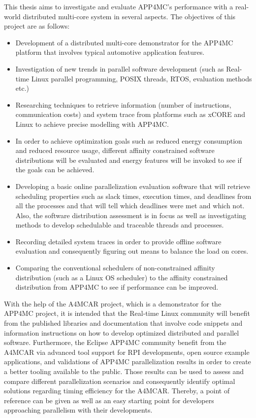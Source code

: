 This thesis aims to investigate and evaluate APP4MC's performance with a real-world distributed multi-core system in several aspects. The objectives of this project are as follows:
\begin{itemize}
	\item Development of a distributed multi-core demonstrator for the APP4MC platform that involves typical automotive application features.
	\item Investigation of new trends in parallel software development (such as Real-time Linux parallel programming, POSIX threads, RTOS, evaluation methods etc.)
	\item Researching techniques to retrieve information (number of instructions, communication costs) and system trace from platforms such as xCORE and Linux to achieve precise modelling with APP4MC.
	\item In order to achieve optimization goals such as reduced energy consumption and reduced resource usage, different affinity constrained software distributions will be evaluated and energy features will be invoked to see if the goals can be achieved.
	\item Developing a basic online parallelization evaluation software that will retrieve scheduling properties such as slack times, execution times, and deadlines from all the processes and that will tell which deadlines were met and which not. Also, the software distribution assessment is in focus as well as investigating methods to develop schedulable and traceable threads and processes.
	\item Recording detailed system traces in order to provide offline software evaluation and consequently figuring out means to balance the load on cores.
	\item Comparing the conventional schedulers of non-constrained affinity distribution (such as a Linux OS scheduler) to the affinity constrained distribution from APP4MC to see if performance can be improved.
\end{itemize}

With the help of the A4MCAR project, which is a demonstrator for the APP4MC project, it is intended that the Real-time Linux community will benefit from the published libraries and documentation that involve code snippets and information instructions on how to develop optimized distributed and parallel software. Furthermore, the Eclipse APP4MC community benefit from the A4MCAR via advanced tool support for RPI developments, open source example applications, and validations of APP4MC parallelization results in order to create a better tooling available to the public. Those results can be used to assess and compare different parallelization scenarios and consequently identify optimal solutions regarding timing efficiency for the A4MCAR. Thereby, a point of reference can be given as well as an easy starting point for developers approaching parallelism with their developments.

